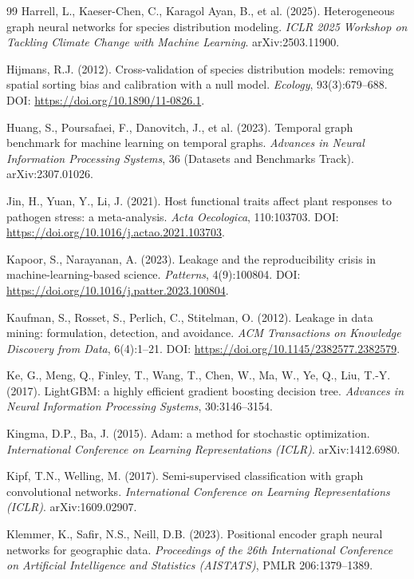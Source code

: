 \documentclass[a4paper,fleqn]{cas-sc}
\begin{document}
\begin{thebibliography}{99}
 Harrell, L., Kaeser-Chen, C., Karagol Ayan, B., et al. (2025). Heterogeneous graph neural networks for species distribution modeling. \textit{ICLR 2025 Workshop on Tackling Climate Change with Machine Learning}. arXiv:2503.11900.

 Hijmans, R.J. (2012). Cross-validation of species distribution models: removing spatial sorting bias and calibration with a null model. \textit{Ecology}, 93(3):679--688. DOI: \url{https://doi.org/10.1890/11-0826.1}.

 Huang, S., Poursafaei, F., Danovitch, J., et al. (2023). Temporal graph benchmark for machine learning on temporal graphs. \textit{Advances in Neural Information Processing Systems}, 36 (Datasets and Benchmarks Track). arXiv:2307.01026.

 Jin, H., Yuan, Y., Li, J. (2021). Host functional traits affect plant responses to pathogen stress: a meta-analysis. \textit{Acta Oecologica}, 110:103703. DOI: \url{https://doi.org/10.1016/j.actao.2021.103703}.

 Kapoor, S., Narayanan, A. (2023). Leakage and the reproducibility crisis in machine-learning-based science. \textit{Patterns}, 4(9):100804. DOI: \url{https://doi.org/10.1016/j.patter.2023.100804}.

 Kaufman, S., Rosset, S., Perlich, C., Stitelman, O. (2012). Leakage in data mining: formulation, detection, and avoidance. \textit{ACM Transactions on Knowledge Discovery from Data}, 6(4):1--21. DOI: \url{https://doi.org/10.1145/2382577.2382579}.

 Ke, G., Meng, Q., Finley, T., Wang, T., Chen, W., Ma, W., Ye, Q., Liu, T.-Y. (2017). LightGBM: a highly efficient gradient boosting decision tree. \textit{Advances in Neural Information Processing Systems}, 30:3146--3154.

 Kingma, D.P., Ba, J. (2015). Adam: a method for stochastic optimization. \textit{International Conference on Learning Representations (ICLR)}. arXiv:1412.6980.

 Kipf, T.N., Welling, M. (2017). Semi-supervised classification with graph convolutional networks. \textit{International Conference on Learning Representations (ICLR)}. arXiv:1609.02907.

 Klemmer, K., Safir, N.S., Neill, D.B. (2023). Positional encoder graph neural networks for geographic data. \textit{Proceedings of the 26th International Conference on Artificial Intelligence and Statistics (AISTATS)}, PMLR 206:1379--1389.


\end{thebibliography}
\end{document}
